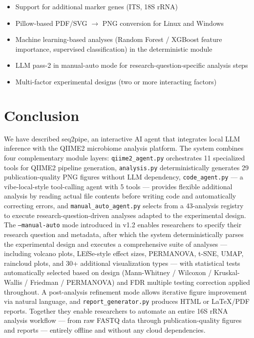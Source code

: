 \documentclass[12pt, a4paper]{article}
\begin{document}
\begin{itemize}
  \item Support for additional marker genes (ITS, 18S rRNA)
  \item Pillow-based PDF/SVG $\to$ PNG conversion for Linux and Windows
  \item Machine learning-based analyses (Random Forest / XGBoost feature importance,
    supervised classification) in the deterministic module
  \item LLM pass-2 in manual-auto mode for research-question-specific analysis steps
  \item Multi-factor experimental designs (two or more interacting factors)
\end{itemize}

\section{Conclusion}

We have described seq2pipe, an interactive AI agent that integrates
local LLM inference with the QIIME2 microbiome analysis platform.
The system combines four complementary module layers:
\texttt{qiime2\_agent.py} orchestrates 11 specialized tools for
QIIME2 pipeline generation, \texttt{analysis.py} deterministically
generates 29 publication-quality PNG figures without LLM dependency,
\texttt{code\_agent.py} --- a vibe-local-style tool-calling agent
with 5 tools --- provides flexible additional analysis by reading
actual file contents before writing code and automatically correcting errors,
and \texttt{manual\_auto\_agent.py} selects from a 43-analysis registry
to execute research-question-driven analyses adapted to the experimental design.
The \texttt{--manual-auto} mode introduced in v1.2 enables researchers to specify
their research question and metadata, after which the system deterministically
parses the experimental design and executes a comprehensive suite of analyses ---
including volcano plots, LEfSe-style effect sizes, PERMANOVA, t-SNE, UMAP,
raincloud plots, and 30+ additional visualization types --- with statistical tests
automatically selected based on design (Mann-Whitney / Wilcoxon / Kruskal-Wallis /
Friedman / PERMANOVA) and FDR multiple testing correction applied throughout.
A post-analysis refinement mode allows iterative figure improvement via
natural language, and \texttt{report\_generator.py} produces HTML or
LaTeX/PDF reports.
Together they enable researchers to automate an entire 16S rRNA analysis workflow ---
from raw FASTQ data through publication-quality figures
and reports --- entirely offline and without any cloud dependencies.
\end{document}
